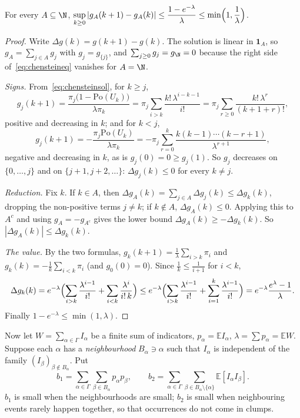 \begin{lemma}\label{lem:chensteinsol}
For every $A\subseteq\N$, $\displaystyle\sup_{k\ge0}|g_A(k+1)-g_A(k)|\le\frac{1-e^{-\lambda}}\lambda\le\min\Bigl(1,\frac1\lambda\Bigr)$.
\end{lemma}
\begin{proof}
Write $\Delta g(k)=g(k+1)-g(k)$. The solution is linear in $\mathbf 1_A$, so $g_A=\sum_{j\in A}g_j$ with $g_j=g_{\{j\}}$, and $\sum_{j\ge0}g_j=g_\N=0$ because
the right side of~\eqref{eq:chensteineq} vanishes for $A=\N$.

\emph{Signs.} From~\eqref{eq:chensteinsol}, for $k\ge j$,
\[
g_j(k+1)=\frac{\pi_j\bigl(1-\mathrm{Po}(U_k)\bigr)}{\lambda\pi_k}=\pi_j\sum_{i>k}\frac{k!\,\lambda^{i-k-1}}{i!}=\pi_j\sum_{r\ge0}\frac{k!\,\lambda^r}{(k+1+r)!},
\]
positive and decreasing in $k$; and for $k<j$,
\[
g_j(k+1)=-\frac{\pi_j\mathrm{Po}(U_k)}{\lambda\pi_k}=-\pi_j\sum_{r=0}^k\frac{k(k-1)\cdots(k-r+1)}{\lambda^{r+1}},
\]
negative and decreasing in $k$, as is $g_j(0)=0\ge g_j(1)$. So $g_j$ decreases on $\{0,\dots,j\}$ and on $\{j+1,j+2,\dots\}$: $\Delta g_j(k)\le0$ for every $k\ne j$.

\emph{Reduction.} Fix $k$. If $k\in A$, then $\Delta g_A(k)=\sum_{j\in A}\Delta g_j(k)\le\Delta g_k(k)$, dropping the non-positive terms $j\ne k$; if $k\notin A$,
$\Delta g_A(k)\le0$. Applying this to $A^c$ and using $g_A=-g_{A^c}$ gives the lower bound $\Delta g_A(k)\ge-\Delta g_k(k)$. So $|\Delta g_A(k)|\le\Delta g_k(k)$.

\emph{The value.} By the two formulas, $g_k(k+1)=\frac1\lambda\sum_{i>k}\pi_i$ and $g_k(k)=-\frac1k\sum_{i<k}\pi_i$ (and $g_0(0)=0$). Since $\frac1k\le\frac1{i+1}$ for $i<k$,
\[
\Delta g_k(k)=e^{-\lambda}\Bigl(\sum_{i>k}\frac{\lambda^{i-1}}{i!}+\sum_{i<k}\frac{\lambda^i}{i!\,k}\Bigr)\le e^{-\lambda}\Bigl(\sum_{i>k}\frac{\lambda^{i-1}}{i!}+\sum_{i=1}^{k}\frac{\lambda^{i-1}}{i!}\Bigr)
=e^{-\lambda}\frac{e^\lambda-1}\lambda.
\]
Finally $1-e^{-\lambda}\le\min(1,\lambda)$.
\end{proof}

Now let $W=\sum_{\alpha\in\Gamma}I_\alpha$ be a finite sum of indicators, $p_\alpha=\mathbb EI_\alpha$, $\lambda=\sum p_\alpha=\mathbb EW$. Suppose each $\alpha$ has a
\emph{neighbourhood} $B_\alpha\ni\alpha$ such that $I_\alpha$ is independent of the family $(I_\beta)_{\beta\notin B_\alpha}$. Put
\[
b_1=\sum_{\alpha\in\Gamma}\sum_{\beta\in B_\alpha}p_\alpha p_\beta,\qquad b_2=\sum_{\alpha\in\Gamma}\sum_{\beta\in B_\alpha\setminus\{\alpha\}}\mathbb E[I_\alpha I_\beta].
\]
$b_1$ is small when the neighbourhoods are small; $b_2$ is small when neighbouring events rarely happen together, so that occurrences do not come in clumps.

